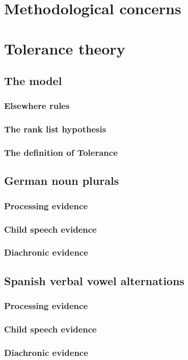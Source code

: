 \documentclass{upenndiss}
\begin{document}
\section{Methodological concerns}
\section{Tolerance theory}
\subsection{The model}
\subsubsection{Elsewhere rules}
\subsubsection{The rank list hypothesis}
\subsubsection{The definition of Tolerance}
\subsection{German noun plurals}
\subsubsection{Processing evidence}
\subsubsection{Child speech evidence}
\subsubsection{Diachronic evidence}
\subsection{Spanish verbal vowel alternations}
\subsubsection{Processing evidence}
\subsubsection{Child speech evidence}
\subsubsection{Diachronic evidence}
\end{document}
